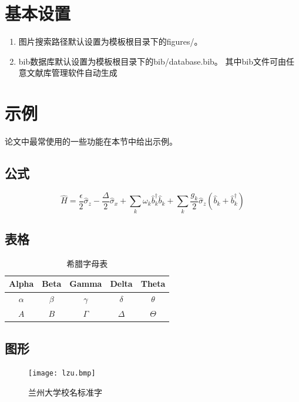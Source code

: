 \documentclass{LZUthesis}
\begin{document}
\section{基本设置}
\begin{enumerate}
\item 图片搜索路径默认设置为模板根目录下的figures/。
\item bib数据库默认设置为模板根目录下的bib/database.bib。 其中bib文件可由任意文献库管理软件自动生成
\end{enumerate}


\section{示例}
论文中最常使用的一些功能在本节中给出示例。

\subsection{公式}
\begin{equation}
\hat{H}=\frac{\epsilon}{2}\hat{\sigma}_{z}-\frac{\Delta}{2}\hat{\sigma}_{x}+\sum_{k}\omega_{k}\hat{b}_{k}^{\dagger}\hat{b}_{k}+\sum_{k}\frac{g_{k}}{2}\hat{\sigma}_{z}(\hat{b}_{k}+\hat{b}_{k}^{\dagger})\label{eq:sbm}
\end{equation}


\subsection{表格}
\begin{table}[H]
\begin{centering}
\begin{tabular}{|c|c|c|c|c|}
\hline
Alpha & Beta & Gamma & Delta & Theta\\
\hline
$\alpha$ & $\beta$ & $\gamma$ & $\delta$ & $\theta$\\
\hline
$A$ & $B$ & $\Gamma$ & $\Delta$ & $\Theta$\\
\hline
\end{tabular}
\par\end{centering}
\protect\caption{希腊字母表\label{tab:Greek}}
\end{table}


\subsection{图形}


\begin{figure}[H]
\begin{centering}
\texttt{[image: lzu.bmp]}\\
\end{centering}
\protect\caption{兰州大学校名标准字\label{fig:lzu}}
\end{figure}
\end{document}
